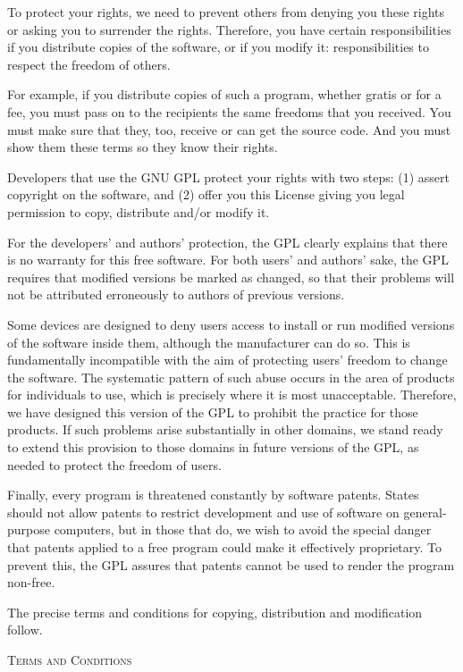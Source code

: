 \documentclass{scrbook}
\begin{document}
To protect your rights, we need to prevent others from denying you
these rights or asking you to surrender the rights.  Therefore, you have
certain responsibilities if you distribute copies of the software, or if
you modify it: responsibilities to respect the freedom of others.

For example, if you distribute copies of such a program, whether
gratis or for a fee, you must pass on to the recipients the same
freedoms that you received.  You must make sure that they, too, receive
or can get the source code.  And you must show them these terms so they
know their rights.

Developers that use the GNU GPL protect your rights with two steps:
(1) assert copyright on the software, and (2) offer you this License
giving you legal permission to copy, distribute and/or modify it.

For the developers' and authors' protection, the GPL clearly explains
that there is no warranty for this free software.  For both users' and
authors' sake, the GPL requires that modified versions be marked as
changed, so that their problems will not be attributed erroneously to
authors of previous versions.

Some devices are designed to deny users access to install or run
modified versions of the software inside them, although the manufacturer
can do so.  This is fundamentally incompatible with the aim of
protecting users' freedom to change the software.  The systematic
pattern of such abuse occurs in the area of products for individuals to
use, which is precisely where it is most unacceptable.  Therefore, we
have designed this version of the GPL to prohibit the practice for those
products.  If such problems arise substantially in other domains, we
stand ready to extend this provision to those domains in future versions
of the GPL, as needed to protect the freedom of users.

Finally, every program is threatened constantly by software patents.
States should not allow patents to restrict development and use of
software on general-purpose computers, but in those that do, we wish to
avoid the special danger that patents applied to a free program could
make it effectively proprietary.  To prevent this, the GPL assures that
patents cannot be used to render the program non-free.

The precise terms and conditions for copying, distribution and
modification follow.

\begin{center}
{\Large\textsc{Terms and Conditions}}
\end{center}
\end{document}

